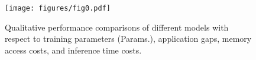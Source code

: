 \begin{figure}[t]
\centering
\texttt{[image: figures/fig0.pdf]}
\vspace{-3mm}
\caption{Qualitative performance comparisons of different models with respect to training parameters (Params.), application gaps, memory access costs, and inference time costs.}
\vspace{-3mm}
\label{fig0}
\end{figure}
